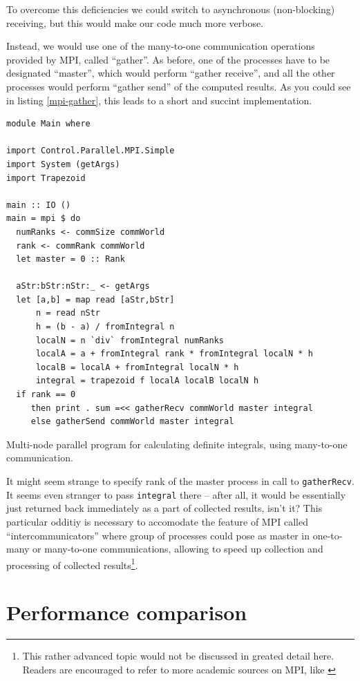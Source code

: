 \documentclass{tmr}
\begin{document}
To overcome this deficiencies we could switch to asynchronous
(non-blocking) receiving, but this would make our code much more
verbose.

Instead, we would use one of the many-to-one communication operations
provided by MPI, called ``gather''. As before, one of the processes
have to be designated ``master'', which would perform ``gather
receive'', and all the other processes would perform ``gather send''
of the computed results. As you could see in listing \ref{mpi-gather},
this leads to a short and succint implementation.

\begin{listing}
\begin{Verbatim}
module Main where

import Control.Parallel.MPI.Simple
import System (getArgs)
import Trapezoid

main :: IO ()
main = mpi $ do
  numRanks <- commSize commWorld
  rank <- commRank commWorld
  let master = 0 :: Rank
  
  aStr:bStr:nStr:_ <- getArgs
  let [a,b] = map read [aStr,bStr]
      n = read nStr
      h = (b - a) / fromIntegral n
      localN = n `div` fromIntegral numRanks
      localA = a + fromIntegral rank * fromIntegral localN * h
      localB = localA + fromIntegral localN * h
      integral = trapezoid f localA localB localN h
  if rank == 0
     then print . sum =<< gatherRecv commWorld master integral
     else gatherSend commWorld master integral
\end{Verbatim}
\caption{Multi-node parallel program for calculating definite
  integrals, using many-to-one communication. \label{mpi-gather}}
\end{listing}

It might seem strange to specify rank of the master process in call to
\verb|gatherRecv|. It seems even stranger to pass \verb|integral|
there -- after all, it would be essentially just returned back
immediately as a part of collected results, isn't it? This particular
odditiy is necessary to accomodate the feature of MPI called
``intercommunicators'' where group of processes could pose as master
in one-to-many or many-to-one communications, allowing to speed up
collection and processing of collected results\footnote{This rather
  advanced topic would not be discussed in greated detail here.
  Readers are encouraged to refer to more academic sources on MPI,
  like \cite{2}}.

\section{Performance comparison}
\end{document}
